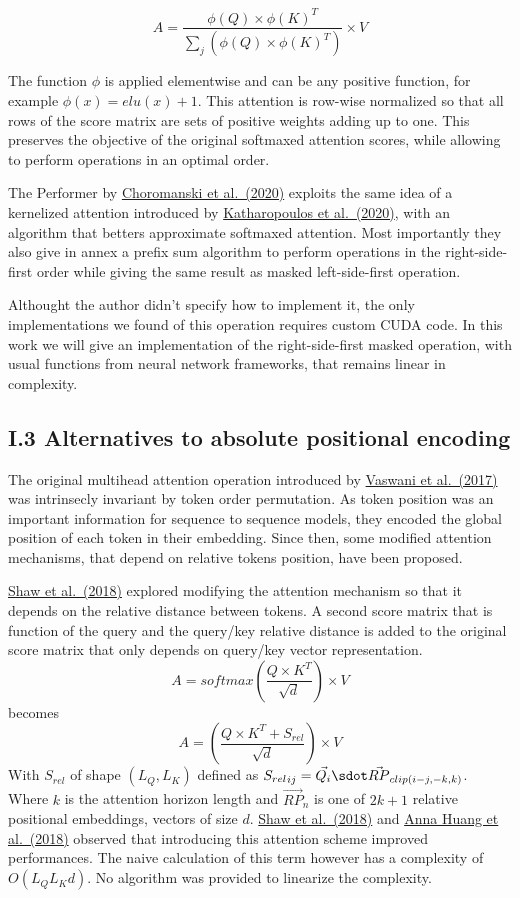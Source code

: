 \[A = \frac{\phi(Q) \times \phi(K)^T}{\sum_j \left( \phi(Q) \times \phi(K)^T \right)} \times V\]

The function \(\phi\) is applied elementwise and can be any positive
function, for example \(\phi(x) = elu(x) + 1\). This attention is
row-wise normalized so that all rows of the score matrix are sets of
positive weights adding up to one. This preserves the objective of the
original softmaxed attention scores, while allowing to perform
operations in an optimal order.

The Performer by \href{https://arxiv.org/abs/2009.14794}{Choromanski et
al.~(2020)} exploits the same idea of a kernelized attention introduced
by \href{https://arxiv.org/abs/2006.16236}{Katharopoulos et al.~(2020)},
with an algorithm that betters approximate softmaxed attention. Most
importantly they also give in annex a prefix sum algorithm to perform
operations in the right-side-first order while giving the same result as
masked left-side-first operation.

Althought the author didn't specify how to implement it, the only
implementations we found of this operation requires custom CUDA code. In
this work we will give an implementation of the right-side-first masked
operation, with usual functions from neural network frameworks, that
remains linear in complexity.

\hypertarget{i.3-alternatives-to-absolute-positional-encoding}{%
\subsection{I.3 Alternatives to absolute positional
encoding}\label{i.3-alternatives-to-absolute-positional-encoding}}

The original multihead attention operation introduced by
\href{https://arxiv.org/abs/1706.03762}{Vaswani et al.~(2017)} was
intrinsecly invariant by token order permutation. As token position was
an important information for sequence to sequence models, they encoded
the global position of each token in their embedding. Since then, some
modified attention mechanisms, that depend on relative tokens position,
have been proposed.

\href{https://arxiv.org/abs/1803.02155}{Shaw et al.~(2018)} explored
modifying the attention mechanism so that it depends on the relative
distance between tokens. A second score matrix that is function of the
query and the query/key relative distance is added to the original score
matrix that only depends on query/key vector representation.
\[A = softmax\left(\frac{Q \times K^T}{\sqrt{d}}\right) \times V\]
becomes
\[A = \left(\frac{Q \times K^T + S_{rel}}{\sqrt{d}}\right) \times V\]
With \(S_{rel}\) of shape \((L_Q, L_K)\) defined as
\({S_{rel}}_{ij} = \vec{Q_i} \sdot \vec{RP}_{clip(i-j, -k, k)}\). Where
\(k\) is the attention horizon length and \(\vec{RP}_n\) is one of
\(2k+1\) relative positional embeddings, vectors of size \(d\).
\href{https://arxiv.org/abs/1803.02155}{Shaw et al.~(2018)} and
\href{https://arxiv.org/abs/1809.04281}{Anna Huang et al.~(2018)}
observed that introducing this attention scheme improved performances.
The naive calculation of this term however has a complexity of
\(O(L_QL_Kd)\). No algorithm was provided to linearize the complexity.

